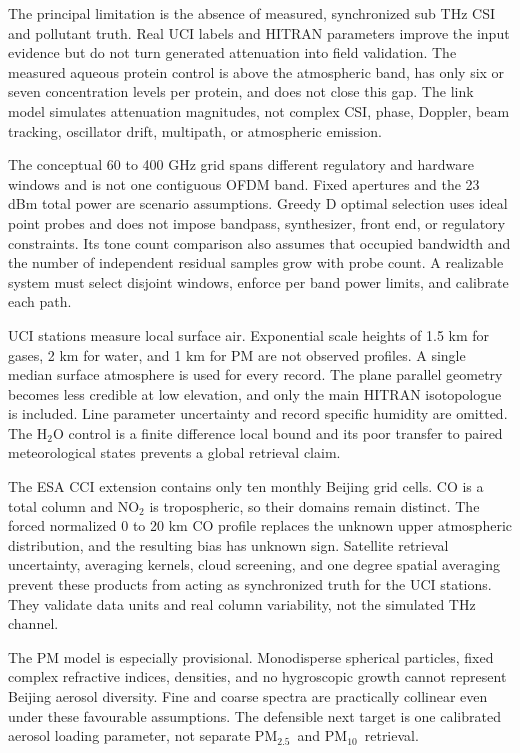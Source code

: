 \documentclass[conference]{IEEEtran}
\newcommand{\pmfive}{PM$_{2.5}$}
\newcommand{\pmten}{PM$_{10}$}
\begin{document}
The principal limitation is the absence of measured, synchronized sub THz CSI and pollutant truth. Real UCI labels and HITRAN parameters improve the input evidence but do not turn generated attenuation into field validation. The measured aqueous protein control is above the atmospheric band, has only six or seven concentration levels per protein, and does not close this gap. The link model simulates attenuation magnitudes, not complex CSI, phase, Doppler, beam tracking, oscillator drift, multipath, or atmospheric emission.

The conceptual 60 to 400 GHz grid spans different regulatory and hardware windows and is not one contiguous OFDM band. Fixed apertures and the 23 dBm total power are scenario assumptions. Greedy D optimal selection uses ideal point probes and does not impose bandpass, synthesizer, front end, or regulatory constraints. Its tone count comparison also assumes that occupied bandwidth and the number of independent residual samples grow with probe count. A realizable system must select disjoint windows, enforce per band power limits, and calibrate each path.

UCI stations measure local surface air. Exponential scale heights of 1.5 km for gases, 2 km for water, and 1 km for PM are not observed profiles. A single median surface atmosphere is used for every record. The plane parallel geometry becomes less credible at low elevation, and only the main HITRAN isotopologue is included. Line parameter uncertainty and record specific humidity are omitted. The H$_2$O control is a finite difference local bound and its poor transfer to paired meteorological states prevents a global retrieval claim.

The ESA CCI extension contains only ten monthly Beijing grid cells. CO is a total column and NO$_2$ is tropospheric, so their domains remain distinct. The forced normalized 0 to 20 km CO profile replaces the unknown upper atmospheric distribution, and the resulting bias has unknown sign. Satellite retrieval uncertainty, averaging kernels, cloud screening, and one degree spatial averaging prevent these products from acting as synchronized truth for the UCI stations. They validate data units and real column variability, not the simulated THz channel.

The PM model is especially provisional. Monodisperse spherical particles, fixed complex refractive indices, densities, and no hygroscopic growth cannot represent Beijing aerosol diversity. Fine and coarse spectra are practically collinear even under these favourable assumptions. The defensible next target is one calibrated aerosol loading parameter, not separate \pmfive\ and \pmten\ retrieval.
\end{document}

